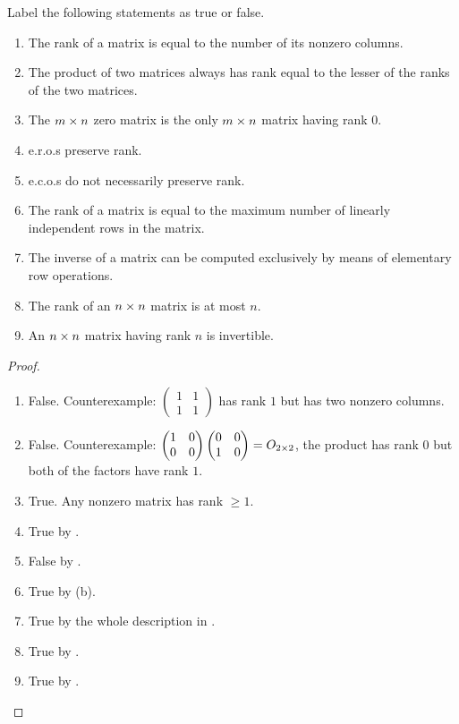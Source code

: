 \exercisesection

\begin{exercise} \label{exercise 3.2.1}
Label the following statements as true or false.
\begin{enumerate}
\item The rank of a matrix is equal to the number of its nonzero columns.
\item The product of two matrices always has rank equal to the lesser of the ranks of the two matrices.
\item The \(m \times n\) zero matrix is the only \(m \times n\) matrix having rank \(0\).
\item e.r.o.s preserve rank.
\item e.c.o.s do not necessarily preserve rank.
\item The rank of a matrix is equal to the maximum number of linearly independent rows in the matrix.
\item The inverse of a matrix can be computed exclusively by means of elementary row operations.
\item The rank of an \(n \times n\) matrix is at most \(n\).
\item An \(n \times n\) matrix having rank \(n\) is invertible.
\end{enumerate}
\end{exercise}

\begin{proof} \ 

\begin{enumerate}
\item False. Counterexample: \(\begin{pmatrix} 1 & 1 \\ 1 & 1 \end{pmatrix}\) has rank \(1\) but has two nonzero columns.

\item False. Counterexample: \(\begin{pmatrix} 1 & 0 \\ 0 & 0 \end{pmatrix} \begin{pmatrix} 0 & 0 \\ 1 & 0 \end{pmatrix} = O_{2 \times 2}\), the product has rank \(0\) but both of the factors have rank \(1\).

\item True. Any nonzero matrix has rank \(\ge 1\).
\item True by .
\item False by .
\item True by (b).
\item True by the whole description in .
\item True by .
\item True by .
\end{enumerate}
\end{proof}

